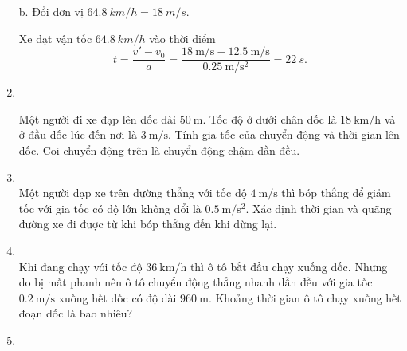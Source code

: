 \begin{enumerate}[label=\bfseries Bài \arabic*:,leftmargin=1.5cm]
{	b. Đổi đơn vị $\SI{64,8}{km/h} = \SI{18}{m/s}$.
	
	Xe đạt vận tốc $\SI{64,8}{km/h}$ vào thời điểm 
	$$t= \dfrac{v'-v_0}{a}=\dfrac{\SI{18}{\meter/\second}-\SI{12.5}{\meter/\second}}{\SI{0.25}{\meter/\second^{2}}} = \SI{22}{s}.$$
	
}



	\item {}\\
	{Một người đi xe đạp lên dốc dài $\SI{50}{\meter}$. Tốc độ ở dưới chân dốc là $\SI{18}{\kilo\meter/\hour}$ và ở đầu dốc lúc đến nơi là $\SI{3}{\meter/\second}$. Tính gia tốc của chuyển động và thời gian lên dốc. Coi chuyển động trên là chuyển động chậm dần đều.
	
}

\item {}\\
Một người đạp xe trên đường thẳng với tốc độ $\SI{4}{\meter/\second}$ thì bóp thắng để giảm tốc với gia tốc có độ lớn không đổi là $\SI{0.5}{\meter/\second^2}$. Xác định thời gian và quãng đường xe đi được từ khi bóp thắng đến khi dừng lại.

\item {}\\
Khi đang chạy với tốc độ $\SI{36}{\kilo\meter/\hour}$ thì ô tô bắt đầu chạy xuống dốc. Nhưng do bị mất phanh nên ô tô chuyển động thẳng nhanh dần đều với gia tốc $\SI{0.2}{\meter/\second}$ xuống hết dốc có độ dài $\SI{960}{\meter}$. Khoảng thời gian ô tô chạy xuống hết đoạn dốc là bao nhiêu?

	\item {}
	

\end{enumerate}
